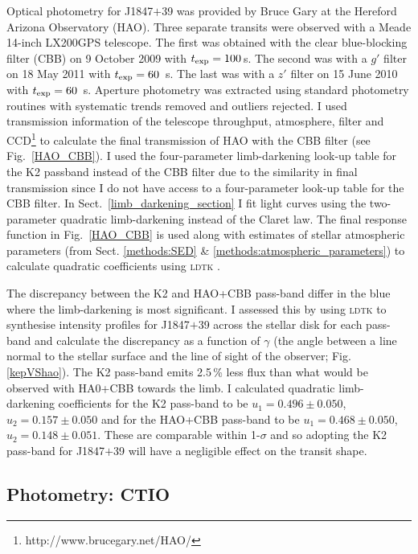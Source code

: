 Optical photometry for J1847$+$39 was provided by Bruce Gary at the Hereford Arizona Observatory (HAO). Three separate transits were observed with a Meade 14-inch LX200GPS telescope. The first was obtained with the clear blue-blocking filter (CBB) on 9 October 2009 with $t_{\rm exp} = 100$\,s. The second was with a $g'$ filter on 18 May 2011 with $t_{\rm exp} = 60$\, s. The last was with a $z'$ filter on 15 June 2010 with $t_{\rm exp} = 60$\, s. Aperture photometry was extracted using standard photometry routines with systematic trends removed and outliers rejected.  I used transmission information of the telescope throughput, atmosphere, filter and CCD\footnote{http://www.brucegary.net/HAO/} to calculate the final transmission of HAO with the CBB filter (see Fig.~\ref{HAO_CBB}). I used the four-parameter limb-darkening look-up table for the K2 passband instead of the CBB filter due to the similarity in final transmission since I do not have access to a four-parameter look-up table for the CBB filter. In Sect.~\ref{limb_darkening_section} I fit light curves
using the two-parameter quadratic limb-darkening instead of the Claret law. The final response function in Fig.~\ref{HAO_CBB} is used  along with estimates of stellar atmospheric parameters (from Sect. \ref{methods:SED} \& \ref{methods:atmospheric_parameters}) to calculate quadratic coefficients using \textsc{ldtk} \citep{Parviainen2015}. 

The discrepancy between the K2 and HAO+CBB pass-band differ in the blue where the limb-darkening is most significant. I assessed this by using \textsc{ldtk} to synthesise intensity profiles for J1847$+$39 across the stellar disk for each pass-band and calculate the discrepancy as a function of $\gamma$ (the angle between a line normal to the stellar surface and the line of sight of the observer; Fig. \ref{kepVShao}). The K2 pass-band emits 2.5\,\% less flux than what would be observed with HA0+CBB towards the limb. I calculated quadratic limb-darkening coefficients for the K2 pass-band to be $u_1 = 0.496 \pm 0.050$, $u_2 = 0.157 \pm 0.050$ and for the HAO+CBB pass-band to be $u_1 = 0.468 \pm 0.050$, $u_2 = 0.148 \pm 0.051$. These are comparable within 1-$\sigma$ and so adopting the K2 pass-band for J1847$+$39 will have a negligible effect on the transit shape.


\subsection{Photometry: CTIO}

